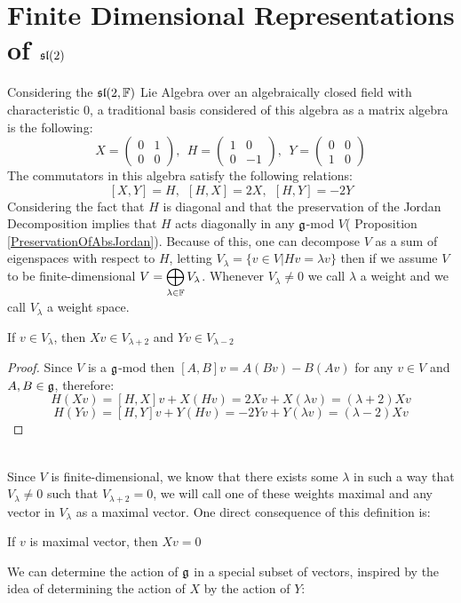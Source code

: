 \section{Finite Dimensional Representations of $\mathfrak{sl}(2)$}
Considering the $\mathfrak{sl}(2,\mathbb{F})$ Lie Algebra over an algebraically closed field with characteristic $0$, a traditional basis considered of this algebra as a matrix algebra is the following:
$$X = \begin{pmatrix}
0 & 1 \\
0 & 0 
\end{pmatrix}, \ \ H = \begin{pmatrix}
1 & 0 \\
0 & -1 
\end{pmatrix}, \ \ Y = \begin{pmatrix}
0 & 0 \\
1 & 0 
\end{pmatrix}$$
The commutators in this algebra satisfy the following relations:
$$[X,Y]=H, \ \ [H,X]=2X, \ \ [H,Y]=-2Y$$
Considering the fact that $H$ is diagonal and that the preservation of the Jordan Decomposition implies that $H$ acts diagonally in any $\mathfrak{g}$-mod $V$( Proposition \ref{PreservationOfAbsJordan}). Because of this, one can decompose $V$ as a sum of eigenspaces with respect to $H$, letting $V_\lambda = \{v \in V|Hv=\lambda v\}$ then if we assume $V$ to be finite-dimensional $V=\displaystyle\bigoplus_{\lambda \in \mathbb{F}} V_\lambda$. Whenever $V_\lambda \not=0$ we call $\lambda$ a weight and we call $V_\lambda$ a weight space.\\
\begin{lema}
	If $v \in V_\lambda$, then $Xv \in V_{\lambda+2}$ and $Yv \in V_{\lambda-2}$
\end{lema}
\begin{proof}
	Since $V$ is a $\mathfrak{g}$-mod then $[A,B]v = A(Bv)-B(Av)$ for any $v \in V$ and $A,B \in \mathfrak{g}$, therefore:
	$$H(Xv)=[H,X]v + X(Hv) = 2Xv + X(\lambda v) = (\lambda + 2)Xv$$
	$$H(Yv)=[H,Y]v + Y(Hv) = -2Yv + Y(\lambda v) = (\lambda - 2)Xv$$
\end{proof}\\
Since $V$ is finite-dimensional, we know that there exists some $\lambda$ in such a way that $V_\lambda\not=0$ such that $V_{\lambda+2}=0$, we will call one of these weights maximal and any vector in $V_\lambda$ as a maximal vector. One direct consequence of this definition is:
\begin{prop}
If $v$ is maximal vector, then $Xv=0$
\end{prop}
We can determine the action of $\mathfrak{g}$ in a special subset of vectors, inspired by the idea of determining the action of $X$ by the action of $Y$:
